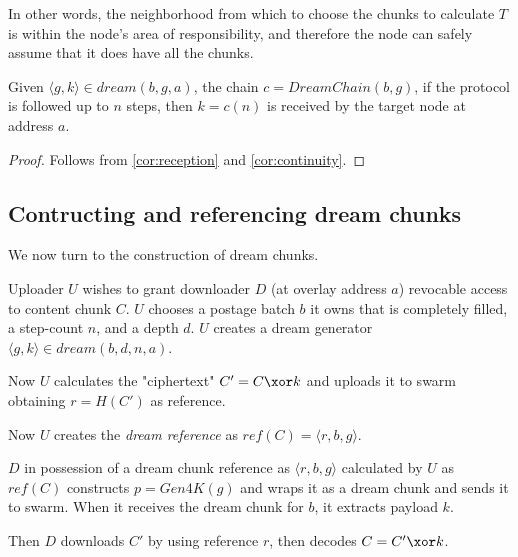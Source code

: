 In other words, the neighborhood from which to choose the chunks to calculate $T$ is within the node's area of responsibility,  and therefore the node can safely assume that it does have all the  chunks.

\begin{corollary}[Termination]
\label{cor:termination}
Given $\langle g, k\rangle \in \mathit{dream}(b,g,a)$, the chain  $c=\mathit{DreamChain}(b,g)$, 
if the protocol is followed up to $n$ steps, then $k=c(n)$ is received by the target node at address $a$. 

\begin{proof}
Follows from \ref{cor:reception} and \ref{cor:continuity}.\qedsymbol
\end{proof}
\end{corollary}

\subsection{Contructing and referencing dream chunks}

We now turn to the construction of dream chunks. 

\begin{definition}
\label{def:dream}
Uploader $U$ wishes to grant downloader $D$ (at overlay address $a$) revocable  access to content chunk $C$.
$U$  chooses a postage batch $b$ it owns that is completely filled, a step-count $n$, and a depth $d$.
$U$ creates a dream generator $\langle g, k\rangle\in\mathit{dream}(b,d,n,a)$.              

Now $U$ calculates the "ciphertext" $C'=C \xor k$ and uploads it to swarm obtaining 
$r=\mathit{H}(C')$ as reference.

Now $U$ creates the \emph{dream reference} as $\mathit{ref}(C)=\langle r,b,g\rangle $.

\end{definition}



\begin{definition}[Retrieval]
\label{def:retrieval}
$D$ in possession of a dream chunk reference as 
$\langle r,b,g\rangle $ calculated by $U$  as $\mathit{ref}(C)$ constructs $p=\mathit{Gen4K}(g)$ and wraps it as a dream chunk and sends it to swarm. When it receives the dream chunk for $b$, it extracts payload $k$.

Then $D$ downloads $C'$ by using reference $r$, then decodes $C=C'\xor k$.
\end{definition}


